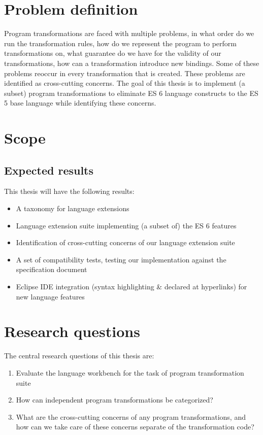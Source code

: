 \section{Problem definition}
Program transformations are faced with multiple problems, in what order do we run the transformation rules, how do we represent the program to perform transformations on, what guarantee do we have for the validity of our transformations, how can a transformation introduce new bindings.
Some of these problems reoccur in every transformation that is created. These problems are identified as cross-cutting concerns. The goal of this thesis is to implement (a subset) program transformations to eliminate ES 6 language constructs to the ES 5 base language while identifying these concerns.

\section{Scope}

\subsection{Expected results}
This thesis will have the following results:
\begin{itemize}
	\item A taxonomy for language extensions
	\item Language extension suite implementing (a subset of) the ES 6 features
	\item Identification of cross-cutting concerns of our language extension suite
	\item A set of compatibility tests, testing our implementation against the specification document
	\item Eclipse IDE integration (syntax highlighting \& declared at hyperlinks) for new language features
\end{itemize}
\section{Research questions}
The central research questions of this thesis are:

\begin{enumerate}
	\item Evaluate the language workbench for the task of program transformation suite
	\item How can independent program transformations be categorized?
	\item What are the cross-cutting concerns of any program transformations, and how can we take care of these concerns separate of the transformation code?
\end{enumerate}


